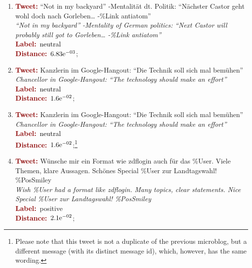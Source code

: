 \begin{enumerate}
\item \textcolor{darkred}{\bfseries Tweet:} ``Not in my backyard''
  -Mentalit\"at dt. Politik: ``N\"achster Castor geht wohl doch nach
  Gorleben\ldots{} -\%Link antiatom''\\
  \textit{``Not in my backyard'' -Mentality of German politics: ``Next Castor will probably still got to Gorleben\ldots{} -\%Link antiatom''}\\
  \textcolor{darkred}{\bfseries Label:}~\textcolor{black}{neutral}\\
  \textcolor{darkred}{\bfseries Distance:}~${6.83}\mathrm{e}^{-03}$;

\item \textcolor{darkred}{\bfseries Tweet:} Kanzlerin im Google-Hangout: ``Die Technik soll sich mal bem\"uhen''\\
  \textit{Chancellor in Google-Hangout: ``The technology should make an effort''}\\
  \textcolor{darkred}{\bfseries Label:}~\textcolor{black}{neutral}\\
  \textcolor{darkred}{\bfseries Distance:}~${1.6}\mathrm{e}^{-02}$;\label{snt:cgsa:exmp:kolchyna-error-0.1}

\item \textcolor{darkred}{\bfseries Tweet:} Kanzlerin im
  Google-Hangout: ``Die Technik soll sich mal
  bem\"uhen''\\ \textit{Chancellor in Google-Hangout: ``The technology
    should make an effort''}\\ \textcolor{darkred}{\bfseries
    Label:}~\textcolor{black}{neutral}\\ \textcolor{darkred}{\bfseries
    Distance:}~${1.6}\mathrm{e}^{-02}$;\footnote{Please note that this
    tweet is not a duplicate of the previous microblog, but a
    different message (with its distinct message id), which, however,
    has the same wording.}\label{snt:cgsa:exmp:kolchyna-error-0.2}

\item \textcolor{darkred}{\bfseries Tweet:} W\"unsche mir ein Format wie zdflogin auch f\"ur das \%User. Viele Themen, klare Aussagen. Sch\"ones Special \%User zur Landtagswahl! \%PosSmiley\\
  \textit{Wish \%User had a format like zdflogin. Many topics, clear statements. Nice Special \%User zur Landtagswahl! \%PosSmiley}\\
  \textcolor{darkred}{\bfseries Label:}~\textcolor{green3}{positive}\\
  \textcolor{darkred}{\bfseries Distance:}~${2.1}\mathrm{e}^{-02}$;


\end{enumerate}
